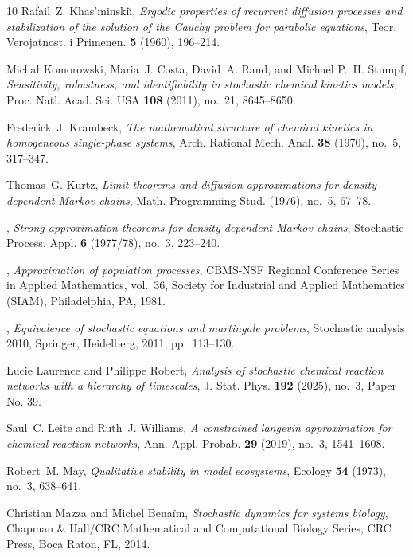 \documentclass[10pt,a4paper]{amsart}
\theoremstyle{definition}
\theoremstyle{remark}
\theoremstyle{consequence}
\numberwithin{equation}{section}
\begin{document}
\begin{thebibliography}{10}
Rafail~Z. Khas'minski\u{\i}, \emph{Ergodic properties of recurrent diffusion
  processes and stabilization of the solution of the {C}auchy problem for
  parabolic equations}, Teor. Verojatnost. i Primenen. \textbf{5} (1960),
  196--214.

Micha{\l} Komorowski, Maria~J. Costa, David~A. Rand, and Michael P.~H. Stumpf,
  \emph{Sensitivity, robustness, and identifiability in stochastic chemical
  kinetics models}, Proc. Natl. Acad. Sci. USA \textbf{108} (2011), no.~21,
  8645--8650.

Frederick~J. Krambeck, \emph{The mathematical structure of chemical kinetics in
  homogeneous single-phase systems}, Arch. Rational Mech. Anal. \textbf{38}
  (1970), no.~5, 317--347.

Thomas~G. Kurtz, \emph{Limit theorems and diffusion approximations for density
  dependent {M}arkov chains}, Math. Programming Stud. (1976), no.~5, 67--78.

\bysame, \emph{Strong approximation theorems for density dependent {M}arkov
  chains}, Stochastic Process. Appl. \textbf{6} (1977/78), no.~3, 223--240.

\bysame, \emph{Approximation of population processes}, CBMS-NSF Regional
  Conference Series in Applied Mathematics, vol.~36, Society for Industrial and
  Applied Mathematics (SIAM), Philadelphia, PA, 1981.

\bysame, \emph{Equivalence of stochastic equations and martingale problems},
  Stochastic analysis 2010, Springer, Heidelberg, 2011, pp.~113--130.

Lucie Laurence and Philippe Robert, \emph{Analysis of stochastic chemical
  reaction networks with a hierarchy of timescales}, J. Stat. Phys.
  \textbf{192} (2025), no.~3, Paper No. 39.

Saul~C. Leite and Ruth~J. Williams, \emph{A constrained langevin approximation
  for chemical reaction networks}, Ann. Appl. Probab. \textbf{29} (2019),
  no.~3, 1541--1608.

Robert~M. May, \emph{Qualitative stability in model ecosystems}, Ecology
  \textbf{54} (1973), no.~3, 638--641.

Christian Mazza and Michel Bena\"im, \emph{Stochastic dynamics for systems
  biology}, Chapman \& Hall/CRC Mathematical and Computational Biology Series,
  CRC Press, Boca Raton, FL, 2014.


\end{thebibliography}
\end{document}
